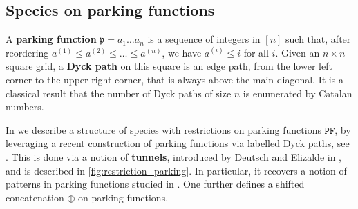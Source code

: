 \documentclass[submission]{FPSAC2023}
\theoremstyle{definition}
\begin{document}
\subsection{Species on parking functions}

A {\bf parking function} $\mathfrak{p} = a_1 \dots a_n$ is a sequence of integers in $[n]$ such that, after reordering $a^{(1)} \leq a^{(2)} \leq \dots \leq a^{(n)}$, we have $a^{(i)} \leq i$ for all $i$. Given an $n\times n$ square grid, a \textbf{Dyck path} on this square is an edge path, from the lower left corner to the upper right corner, that is always above the main diagonal.
It is a classical result that the number of Dyck paths of size $n$ is enumerated by Catalan numbers.

In \cite{PV2022} we describe a structure of species with restrictions on parking functions $\mathtt{PF}$, by leveraging a recent construction of parking functions via labelled Dyck paths, see \cite{BGLPV2021}.
This is done via a notion of \textbf{tunnels}, introduced by Deutsch and Elizalde in \cite{elizalde2003simple}, and is described in \cref{fig:restriction_parking}.
In particular, it recovers a notion of patterns in parking functions studied in \cite{adeniran2022pattern}. 
One further defines a shifted concatenation $\oplus$ on parking functions.
\end{document}
